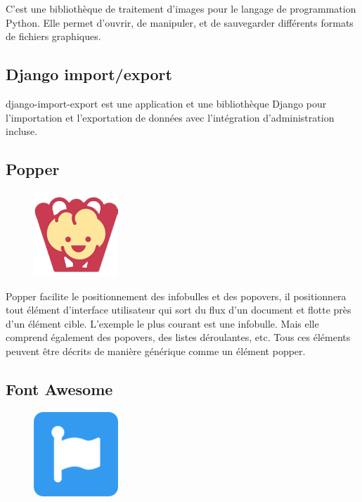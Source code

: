 C’est une bibliothèque de traitement d'images pour le langage de programmation
Python. Elle permet d'ouvrir, de manipuler, et de sauvegarder différents formats 
de fichiers graphiques\cite{25}.

\subsection{Django import/export}
django-import-export est une application et une bibliothèque Django pour
l'importation et l'exportation de données avec l'intégration d'administration
incluse\cite{26}.

\subsection{Popper}
\begin{figure}
    \vspace{-22pt}
    \begin{center}
        \includegraphics[scale=0.36]{images/logo/popper.png}
        \label{fig81}
    \end{center}
    \vspace{-20pt}
    \vspace{-10pt}
\end{figure}

Popper facilite le positionnement des infobulles et des popovers, il
positionnera tout élément d'interface utilisateur qui sort du flux d’un document
et flotte près d'un élément cible. L'exemple le plus courant est une infobulle.
Mais elle comprend également des popovers, des listes déroulantes, etc. Tous ces
éléments peuvent être décrits de manière générique comme un élément
popper\cite{27}.

\subsection{Font Awesome}
\begin{figure}
    \vspace{-22pt}
    \begin{center}
        \includegraphics[scale=0.36]{images/logo/fontawesome.png}
        \label{fig82}
    \end{center}
    \vspace{-20pt}
    \vspace{-10pt}
\end{figure}

